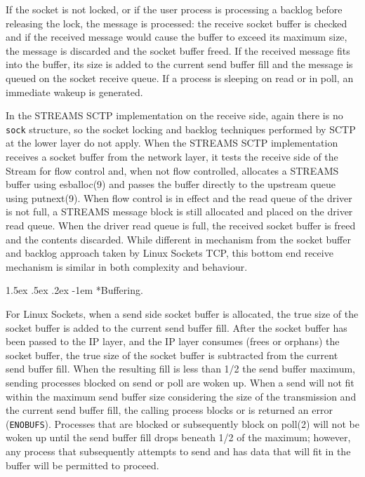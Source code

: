 \documentclass[letterpaper,final,notitlepage,twocolumn,10pt,twoside]{article}
\makeatletter
\let\normalsize = \small
\let\small = \footnotesize
\let\footnotesize = \scriptsize
\let\scriptsize = \tiny
\renewcommand\paragraph{\@startsection{paragraph}{4}{\z@}%
                                    {1.5ex \@plus .5ex \@minus .2ex}%
                                    {-1em}%
                                    {\normalfont\normalsize\bfseries\slshape}}
\makeatother
\begin{document}
If the socket is not locked, or if the user process is processing a backlog before releasing the
lock, the message is processed: the receive socket buffer is checked and if the received message
would cause the buffer to exceed its maximum size, the message is discarded and the socket buffer
freed.  If the received message fits into the buffer, its size is added to the current send buffer
fill and the message is queued on the socket receive queue.  If a process is sleeping on read or in
poll, an immediate wakeup is generated.

In the STREAMS SCTP implementation on the receive side, again there is no \texttt{sock} structure,
so the socket locking and backlog techniques performed by SCTP at the lower layer do not apply.
When the STREAMS SCTP implementation receives a socket buffer from the network layer, it tests the
receive side of the Stream for flow control and, when not flow controlled, allocates a STREAMS
buffer using esballoc(9) and passes the buffer directly to the upstream queue using putnext(9).
When flow control is in effect and the read queue of the driver is not full, a STREAMS message block
is still allocated and placed on the driver read queue.  When the driver read queue is full, the
received socket buffer is freed and the contents discarded.  While different in mechanism from the
socket buffer and backlog approach taken by Linux Sockets TCP, this bottom end receive mechanism is
similar in both complexity and behaviour.

\paragraph*{Buffering.}

For Linux Sockets, when a send side socket buffer is allocated, the true size of the socket buffer
is added to the current send buffer fill.  After the socket buffer has been passed to the IP layer,
and the IP layer consumes (frees or orphans) the socket buffer, the true size of the socket buffer
is subtracted from the current send buffer fill.  When the resulting fill is less than 1/2 the send
buffer maximum, sending processes blocked on send or poll are woken up.  When a send will not fit
within the maximum send buffer size considering the size of the transmission and the current send
buffer fill, the calling process blocks or is returned an error (\texttt{ENOBUFS}).  Processes that
are blocked or subsequently block on poll(2) will not be woken up until the send buffer fill drops
beneath 1/2 of the maximum; however, any process that subsequently attempts to send and has data
that will fit in the buffer will be permitted to proceed.
\end{document}

